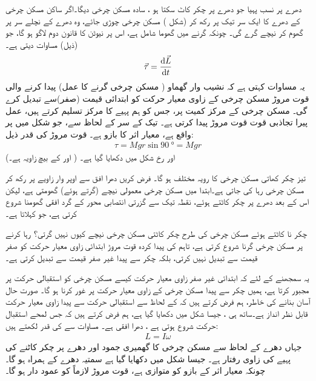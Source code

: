  دھرے پر نسب پہیا جو دھرے  پر چکر کاٹ سکتا ہو   ،  سادہ مسکن چرخی   دیگا۔اگر ساکن  مسکن چرخی کے دھرے کا ایک سر  تیک پر رکھ کر (شکل ) مسکن چرخی  چوڑی جائے،  وہ دھرے کے نچلے سر پر گھوم کر نیچے گرے گی۔ چونکہ گرنے میں گھوما شامل ہے، اس پر نیوٹن کا قانون دوم لاگو ہو گا، جو   (ذیل) مساوات   دیتی ہے۔
 \begin{align}\label{مساوات_لڑھکاو_قوت_مروڑ_تفرق_معیار_حرکت}
 \vec{\tau}=\frac{\dif\vec{L}}{\dif t}
 \end{align}
 یہ مساوات کہتی ہے کہ نشیب وار گھماو ( مسکن چرخی  گرنے  کا عمل)  پیدا کرنے والی قوت مروڑ   مسکن چرخی کے  زاوی معیار حرکت     کو ابتدائی  قیمت  (صفر)سے تبدیل کرے گی۔ مسکن چرخی کے مرکز کمیت  پر، جس کو ہم پہیے کا مرکز تسلیم کرتے ہیں، عمل پیرا  تجاذبی قوت    قوت مروڑ  پیدا کرتی ہے۔ تیک کے سر  کے لحاظ سے، جو شکل  میں  پر واقع ہے،   معیار اثر کا بازو   ہے۔ قوت مروڑ  کی قدر ذیل:
 \begin{align}\label{مساوات_لڑھکاو_ٹو_نبے}
 \tau=Mgr\sin\SI{90}{\degree}=Mgr
 \end{align}
اور رخ شکل   میں دکھایا گیا ہے۔ ( اور  کے بیچ زاویہ   ہے۔)

تیز چکر کھاتی مسکن چرخی  کا رویہ مختلف ہو گا۔ فرض کریں دھرا افق سے اوپر وار زاویے پر رکھ کر مسکن چرخی رہا کی جاتی ہے۔ابتدا میں مسکن چرخی معمولی نیچے (گرتے ہوئے) گھومتی ہے، لیکن اس کے بعد  دھرے پر چکر کاٹتے ہوئے، نقطہ تیک   سے گزرتی انتصابی محور کے گرد افقی گھومنا شروع کرتی ہے، جو 
 کہلاتا ہے۔

\quad
چکر نا کاٹتے ہوئے مسکن چرخی کی طرح چکر کاٹتی مسکن چرخی نیچے کیوں نہیں گرتی؟ رہا کرنے پر مسکن چرخی گرنا شروع کرتی ہے، تاہم    کی پیدا کردہ قوت مروڑ  ابتدائی زاوی معیار حرکت کو صفر قیمت سے تبدیل نہیں کرتی، بلکہ چکر سے پیدا غیر صفر قیمت  سے  تبدیل کرتی ہے۔

یہ سمجھنے کے لئے کہ ابتدائی غیر صفر زاوی معیار حرکت کیسے مسکن چرخی کو استقبالی حرکت پر مجبور کرتا ہے،  ہمیں چکر  سے پیدا مسکن چرخی کے زاوی معیار حرکت  پر غور کرنا ہو گا۔ صورت حال  آسان بنانے کی خاطر،  ہم فرض کرتے ہیں کہ  کے لحاظ سے استقبالی حرکت سے پیدا زاوی معیار حرکت قابل نظر انداز ہے۔ساتھ ہی ، جیسا شکل  میں دکھایا گیا ہے، ہم فرض کرتے ہیں کہ جس لمحے   استقبال حرکت شروع ہوتی ہے ، دھرا افقی ہے۔ مساوات   سے  کی قدر  لکھتے ہیں:
\begin{align}\label{مساوات_لڑھکاو_استقبال_الف}
L=I\omega
\end{align}
جہاں دھرے کے لحاظ سے   مسکن چرخی کا گھمیری جمود اور دھرے پر چکر کاٹنے کی پہیے کی  زاوی رفتار    ہے۔ جیسا شکل  میں دکھایا گیا ہے سمتیہ  دھرے کے ہمراہ ہو گا۔ چونکہ  معیار اثر کے بازو  کو متوازی ہے، قوت مروڑ  لازماً  کو عمود دار ہو گا۔

